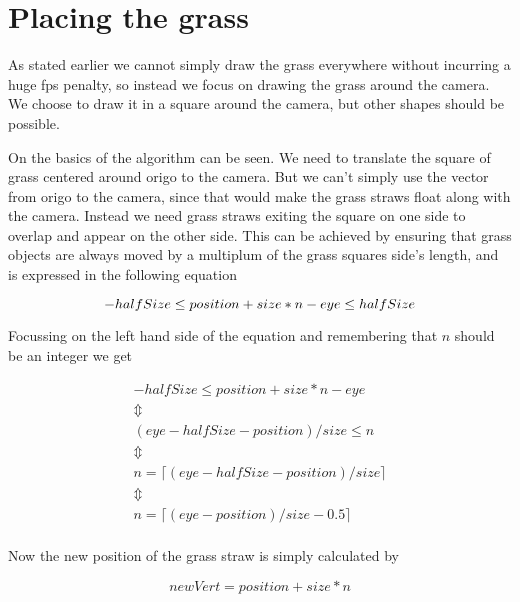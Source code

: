 \section{Placing the grass}

As stated earlier we cannot simply draw the grass everywhere without
incurring a huge fps penalty, so instead we focus on drawing the grass
around the camera. We choose to draw it in a square around the camera,
but other shapes should be possible.


On  the basics of the algorithm can be
seen. We need to translate the square of grass centered around origo
to the camera. But we can't simply use the vector from origo to the
camera, since that would make the grass straws float along with the
camera. Instead we need grass straws exiting the square on one side to
overlap and appear on the other side. This can be achieved by ensuring
that grass objects are always moved by a multiplum of the grass
squares side's length, and is expressed in the following equation

\begin{displaymath}
    -halfSize \le position + size * n - eye \le halfSize \\
\end{displaymath}

Focussing on the left hand side of the equation and remembering that
$n$ should be an integer we get

\begin{displaymath}
  \begin{array}{l}
    -halfSize \le position + size * n - eye \\
    \Updownarrow \\
    (eye - halfSize - position) / size \le n \\
    \Updownarrow \\
    n = \lceil (eye - halfSize - position) / size \rceil \\
    \Updownarrow \\
    n = \lceil (eye - position) / size - 0.5 \rceil \\
  \end{array}
\end{displaymath}

Now the new position of the grass straw is simply calculated by 

\begin{displaymath}
  newVert = position + size * n
\end{displaymath}


